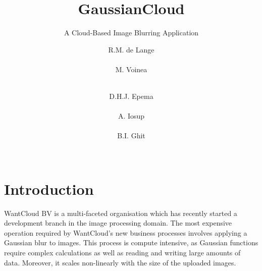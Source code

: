 \documentclass{acm_proc_article-sp}
\begin{document}
\title{GaussianCloud}
\subtitle{A Cloud-Based Image Blurring Application}

\author{
\alignauthor
R.M. de Lange\\
		\\
\alignauthor
M. Voinea\\
		\\
\and
\alignauthor
D.H.J. Epema\\
		\\
\alignauthor
A. Iosup\\
		\\
\alignauthor
B.I. Ghit\\
		\\
}

\maketitle

\begin{abstract}
\end{abstract}

\section{Introduction}
\label{sec:intro}
WantCloud BV is a multi-faceted organisation which has recently started a development branch in the image processing domain.
The most expensive operation required by WantCloud's new business processes involves applying a Gaussian blur to images.
This process is compute intensive, as Gaussian functions require complex calculations as well as reading and writing large amounts of data.
Moreover, it scales non-linearly with the size of the uploaded images.
\end{document}
